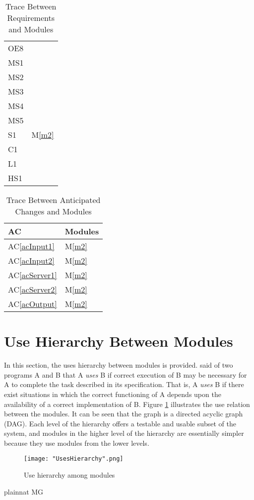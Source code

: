 \documentclass[12pt, titlepage]{article}
\newcommand{\acref}[1]{AC\ref{#1}}
\newcommand{\mref}[1]{M\ref{#1}}
\begin{document}
\begin{table}[H]
\begin{tabular}{p{} p{}}
        OE8 & ~\\
        MS1 & ~\\
        MS2 & ~\\
        MS3 & ~\\
        MS4 & ~\\
        MS5 & ~\\
        S1 & \mref{m2}\\
        C1 & ~\\
        L1 & ~\\
        HS1 & ~\\
        \bottomrule
    \end{tabular}
    \caption{Trace Between Requirements and Modules}
    \label{TblRT}
\end{table}

\begin{table}[H]
    \centering
    \begin{tabular}{p{} p{}}
        \toprule
        \textbf{AC} & \textbf{Modules}\\
        \midrule
        \acref{acInput1} & \mref{m2}\\
        \acref{acInput2} & \mref{m2}\\
        \acref{acServer1} & \mref{m2}\\
        \acref{acServer2} & \mref{m2}\\
        \acref{acOutput} & \mref{m2}\\
        \bottomrule
    \end{tabular}
    \caption{Trace Between Anticipated Changes and Modules}
    \label{TblACT}
\end{table}

\section{Use Hierarchy Between Modules} \label{SecUse}

In this section, the uses hierarchy between modules is provided. \citet{Parnas1978} said of two programs A and B that A {\em uses} B if correct execution of B may be necessary for A to complete the task described in its specification. That is, A {\em uses} B if there exist situations in which the correct functioning of A depends upon the availability of a correct implementation of B.  Figure \ref{FigUH} illustrates the use relation between the modules. It can be seen that the graph is a directed acyclic graph (DAG). Each level of the hierarchy offers a testable and usable subset of the system, and modules in the higher level of the hierarchy are essentially simpler because they use modules from the lower levels.

\begin{figure}[H]
    \centering
    \texttt{[image: "UsesHierarchy".png]}
    \caption{Use hierarchy among modules}
    \label{FigUH}
\end{figure}


 {plainnat}
 {MG}
\end{document}
